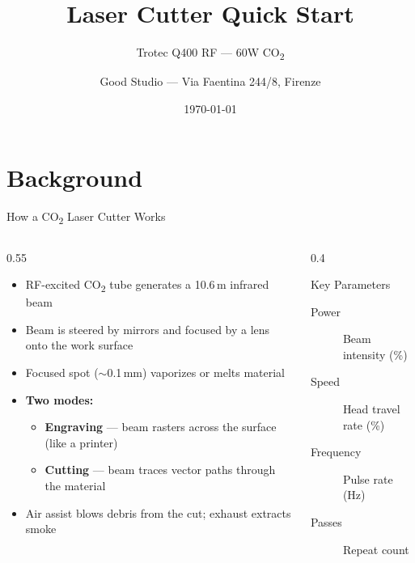 \documentclass[aspectratio=169]{beamer}
\title{Laser Cutter Quick Start}
\subtitle{Trotec Q400 RF --- 60W CO\textsubscript{2}}
\date{\today}
\author{Good Studio --- Via Faentina 244/8, Firenze}
\begin{document}
\maketitle

\section{Background}

\begin{frame}{How a CO\textsubscript{2} Laser Cutter Works}
\begin{columns}
\begin{column}{0.55\textwidth}
\begin{itemize}
    \item RF-excited CO\textsubscript{2} tube generates a 10.6\,\textmu m infrared beam
    \item Beam is steered by mirrors and focused by a lens onto the work surface
    \item Focused spot ($\sim$0.1\,mm) vaporizes or melts material
    \item \textbf{Two modes:}
    \begin{itemize}
        \item \textbf{Engraving} --- beam rasters across the surface (like a printer)
        \item \textbf{Cutting} --- beam traces vector paths through the material
    \end{itemize}
    \item Air assist blows debris from the cut; exhaust extracts smoke
\end{itemize}
\end{column}
\begin{column}{0.4\textwidth}
\begin{block}{Key Parameters}
\begin{description}
    \item[Power] Beam intensity (\%)
    \item[Speed] Head travel rate (\%)
    \item[Frequency] Pulse rate (Hz)
    \item[Passes] Repeat count
\end{description}
\end{block}
\end{column}
\end{columns}
\end{frame}
\end{document}
